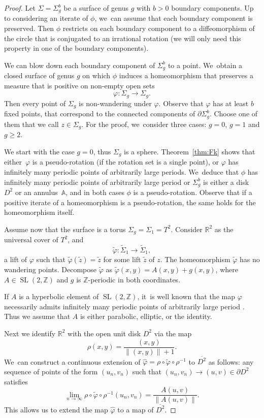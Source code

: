 \documentclass[11pt]{article}
\DeclareMathOperator{\SL}{SL}
\theoremstyle{definition}
\begin{document}
\begin{proof}
Let $\Sigma=\Sigma_g^b$ be a surface of genus $g$ with $b>0$ boundary components. Up to considering an iterate of $\phi$, we~can assume that each boundary component is preserved. Then $\phi$ restricts on each boundary component to a diffeomorphism of the circle that is conjugated to an irrational rotation (we will only need this property in one of the boundary components).

We can blow down each boundary component of $\Sigma_g^b$ to a point. We~obtain a closed surface of genus $g$ on which $\phi$ induces a homeomorphism that preserves a measure that is positive on non-empty open sets
\[
\varphi: \Sigma_g \to \Sigma_g.
\]
Then every point of $\Sigma_g$ is non-wandering under $\varphi$.
Observe that $\varphi$ has at least $b$ fixed points, that correspond to the connected components of $\partial \Sigma_g^b$. Choose one of them that we call $z\in \Sigma_g$. For the proof, we~consider three cases: $g=0$, $g=1$ and $g\geq 2$.

We start with the case $g=0$, thus $\Sigma_g$ is a sphere. Theorem~\ref{thm:Fk} shows that either~$\varphi$ is a pseudo-rotation (if the rotation set is a single point), or $\varphi$ has infinitely many periodic points of arbitrarily large periods. We~deduce that $\phi$ has infinitely many periodic points of arbitrarily large period or $\Sigma_g^b$ is either a disk $D^2$ or an annulus~$\mathbb{A}$, and in both cases $\phi$ is a pseudo-rotation. Observe that if a positive iterate of a homeomorphism is a pseudo-rotation, the same holds for the homeomorphism itself.

Assume now that the surface is a torus $\Sigma_g=\Sigma_1=T^2$. Consider $\mathbb{R}^2$ as the universal cover of $T^2$, and
\[
\widetilde \varphi: \widetilde \Sigma_1 \to \widetilde \Sigma_1,
\]
a lift of $\varphi$ such that $\widetilde \varphi(\widetilde z)=\widetilde z$ for some lift $\widetilde z$ of $z$. The homeomorphism $\widetilde \varphi$ has no wandering points. Decompose $\widetilde \varphi$ as
$\widetilde \varphi(x,y)= A(x,y) + g(x,y)$,
where $A\in \SL(2,\mathbb{Z})$ and $g$ is $\mathbb{Z}$-periodic in both coordinates.

If $A$ is a hyperbolic element of $\SL(2,\mathbb{Z})$, it~is well known that the map $\varphi$ necessarily admits infinitely many periodic points of arbitrarily large period \cite{F0, Ha}. Thus we assume that $A$ is either parabolic, elliptic, or the identity.

Next we identify $\mathbb{R}^2$ with the open unit disk $D^2$ via the map
\[
\rho(x,y)=\frac{(x,y)}{\|(x,y)\|+1}.
\]
We~can construct a continuous extension of $\widehat \varphi= \rho\circ \widetilde \varphi \circ \rho^{-1}$ to $ \overline{D^2}$ as follows: any sequence of points of the form $(u_n,v_n)$ such that $ (u_n,v_n) \rightarrow (u,v) \in \partial D^2$ satisfies
\[
\lim_{n \to \infty} \rho \circ \widetilde \varphi \circ \rho^{-1} (u_n,v_n) = \frac{A(u,v)}{\|A(u,v)\|}.
\]
This allows us to extend the map $\widehat \varphi$ to a map of $\overline{D^2}$.


\end{proof}
\end{document}
